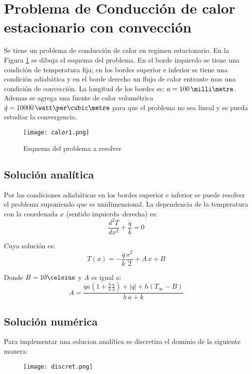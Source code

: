 \section{Problema de Conducci\'on de calor estacionario con convecci\'on}
Se tiene un problema de conducci\'on de calor en regimen estacionario. En la Figura \ref{fig:calorP} se dibuja el esquema del problema. En el borde izquierdo se tiene una condici\'on de temperatura fija; en los bordes superior e inferior se tiene una condici\'on adiab\'atica y en el borde derecho un flujo de calor entrante mas una condici\'on de convecci\'on. La longitud de los bordes es: $a=100\,\milli\metre$. Ademas se agrega una fuente de calor volum\'etrica $ \dot{q}=10000\, \watt\per\cubic\metre $ para que el problema no sea lineal y se pueda estudiar la convergencia.
\begin{figure}[!ht]
\centering
\texttt{[image: calor1.png]}
\caption{Esquema del problema a resolver}
\label{fig:calorP}
\end{figure}
\subsection{Soluci\'on anal\'itica}
Por las condiciones adiab\'aticas en los bordes superior e inferior se puede resolver el problema suponiendo que es unidimensional. La dependencia de la temperatura con la coordenada $x$ (sentido izquierda--derecha) es:
\begin{equation}
\frac{d^2T}{dx^2}+\frac{\dot{q}}{k}=0
\label{eq:calor1}
\end{equation}

Cuya soluci\'on es:
\begin{equation}
T(x)=-\frac{\dot{q}}{k}\frac{x^2}{2}+A\,x+B
\end{equation}

Donde $B=10\celsius$ y $A$ es igual a:
\begin{equation}
A=\frac{\dot{q}a\left( 1+\frac{h}{k}\frac{a}{2}\right) + |q|+h(T_{\infty}-B)}{h\,a+k}
\end{equation}
\subsection{Soluci\'on num\'erica}
Para implementar una solucion anal\'itica se discretiza el dominio de la siguiente manera:
\begin{figure}[h!]
\centering
\texttt{[image: discret.png]}
\end{figure}

